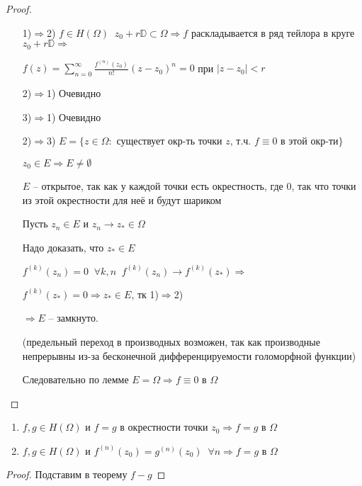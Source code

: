 \begin{proof}\thmslashn
	
	\begin{enumerate}
		\item[1)$\Rightarrow$2)] 
		$f\in H(\Omega) \;\; z_0 + r\mathbb{D} \subset \Omega \Rightarrow f$ раскладывается в ряд тейлора в круге $z_0 + r\mathbb{D} \Rightarrow$
		
		$f(z) = \sum\limits_{n= 0}^{\infty} \frac{f^{(n)}(z_0)}{n!}(z - z_0)^n = 0$ при $|z-z_0| < r$
		\item[2)$\Rightarrow$1)]
		Очевидно
		\item[3)$\Rightarrow$1)]
		Очевидно
		\item[2)$\Rightarrow$3)]
		$E = \{z \in \Omega: \text{ существует окр-ть точки }z\text{, т.ч. } f\equiv 0\text{ в этой окр-ти} \}$
		
		$z_0 \in E \Rightarrow E \not = \emptyset$
		
		$E$ -- открытое, так как у каждой точки есть окрестность, где 0, так что точки из этой окрестности для неё и будут шариком
		
		Пусть $z_n \in E$ и $z_n \to z_* \in \Omega$
		
		Надо доказать, что $z_* \in E$
		
        $f^{(k)}(z_n) = 0\;\; \forall k, n \;\; f^{(k)}(z_n) \to f^{(k)}(z_*) \Rightarrow$
		
		$f^{(k)}(z_*) = 0 \Rightarrow z_* \in E$, тк 1)$\Rightarrow$2)
		
		$\Rightarrow E$ -- замкнуто. 

        (предельный переход в производных возможен, так как производные непрерывны из-за бесконечной дифференцируемости голоморфной функции)
		
		Следовательно по лемме $E = \Omega \Rightarrow f\equiv 0$ в $\Omega$
		
	\end{enumerate}
		
\end{proof}

\begin{consequence}\thmslashn

	\begin{enumerate}
		\item 
		$f, g \in H(\Omega)$ и $f = g$ в окрестности точки $z_0 \Rightarrow f= g$ в $\Omega$
		\item
		$f, g \in H(\Omega)$ и $f^{(n)}(z_0) = g^{(n)}(z_0)\;\; \forall n \Rightarrow f = g$ в $\Omega$ 
	\end{enumerate}
	
\end{consequence}

\begin{proof}
	Подставим в теорему $f - g$
\end{proof}